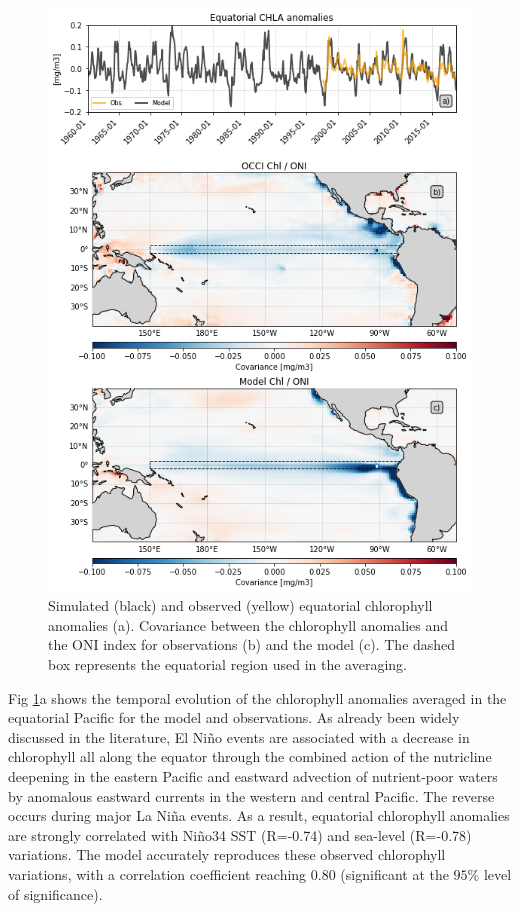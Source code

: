 \begin{figure}[h!tp]
	\centering
	\includegraphics[scale=0.4]{figs/fig2.png}
	\caption{Simulated (black) and observed (yellow) equatorial chlorophyll anomalies (a). Covariance between the chlorophyll anomalies and the ONI index for observations (b) and the model (c). The dashed box represents the equatorial region used in the averaging.}
	\label{fig:nemo-sat-chl}
\end{figure}

Fig \ref{fig:nemo-sat-chl}a shows the temporal evolution of the chlorophyll anomalies averaged in the equatorial Pacific for the model and observations. As already been widely discussed in the literature, El Niño events are associated with a decrease in chlorophyll all along the equator through the combined action of the nutricline deepening in the eastern Pacific and eastward advection of nutrient‐poor waters by anomalous eastward currents in the western and central Pacific. The reverse occurs during major La Niña events. As a result, equatorial chlorophyll anomalies are strongly correlated with Niño34 SST (R=-0.74) and sea-level (R=-0.78) variations. The model accurately reproduces these observed chlorophyll variations, with a correlation coefficient reaching $0.80$ (significant at the $95\%$ level of significance).

